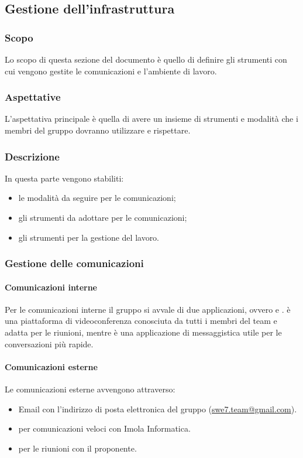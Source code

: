 \subsection{Gestione dell'infrastruttura}
\subsubsection{Scopo}
Lo scopo di questa sezione del documento è quello di definire gli strumenti con cui vengono gestite le comunicazioni e
l'ambiente di lavoro.

\subsubsection{Aspettative}
L'aspettativa principale è quella di avere un insieme di strumenti e modalità che i membri del gruppo dovranno utilizzare e rispettare.

\subsubsection{Descrizione}
In questa parte vengono stabiliti:
\begin{itemize}
    \item le modalità da seguire per le comunicazioni;
    \item gli strumenti da adottare per le comunicazioni;
    \item gli strumenti per la gestione del lavoro.
\end{itemize}

\subsubsection{Gestione delle comunicazioni} 
\paragraph{Comunicazioni interne} \hfill \break
Per le comunicazioni interne il gruppo si avvale di due applicazioni, ovvero  e .
 è una piattaforma di videoconferenza conosciuta da tutti i membri del team e adatta per le riunioni, mentre 
è una applicazione di messaggistica utile per le conversazioni più rapide.

\paragraph{Comunicazioni esterne} \hfill \break
Le comunicazioni esterne avvengono attraverso:
\begin{itemize}
    \item Email con l'indirizzo di posta elettronica del gruppo (\href{mailto:swe7.team@gmail.com}{swe7.team@gmail.com}).
    \item {} per comunicazioni veloci con Imola Informatica.
    \item {} per le riunioni con il proponente.
\end{itemize}

